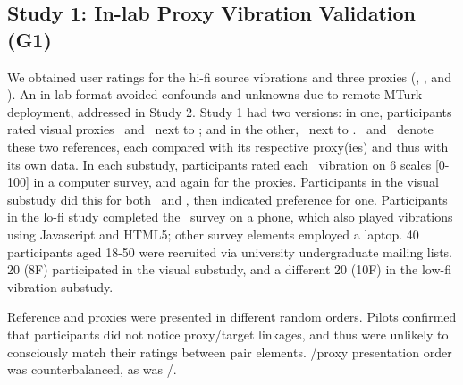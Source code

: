 \subsection{Study 1: In-lab Proxy Vibration Validation (G1)} 
%
We obtained user ratings for the hi-fi source vibrations \hifi and three proxies (\original, \linear, and \lofi). An in-lab format avoided confounds and unknowns due to remote MTurk deployment, addressed in Study 2.
Study 1 had two versions: in one, participants rated visual proxies \original\ and \linear~next to \hifi; and in the other, \lofi\ next to \hifi.
%
\visref\ and \lofiref\ denote these two references, each compared  with its respective proxy(ies) and thus with its own data. 
In each substudy, participants rated each \hifi\ vibration on 6 scales [0-100] in a computer survey, and again for the proxies.
Participants in the visual substudy did this for both \original~and \linear, then indicated preference for one.
Participants in the lo-fi  study completed the \lofi~survey on a phone, which also played vibrations using Javascript and HTML5; other survey elements  employed a laptop.
40 participants aged 18-50 were recruited via university undergraduate mailing lists.
20 (8F) participated in the visual substudy, and a different 20 (10F) in the low-fi vibration substudy.

Reference and proxies were presented in different random orders.
Pilots confirmed that  participants did not notice proxy/target linkages, and thus were unlikely to consciously match their ratings between pair elements. %
\hifi/proxy presentation order was counterbalanced, as was \original/\linear.




 
